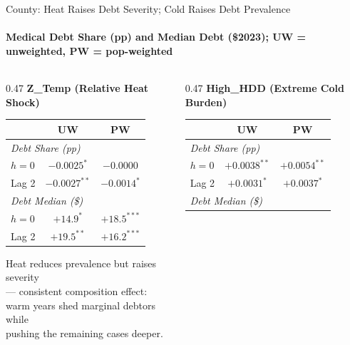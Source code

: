 \documentclass[aspectratio=169,11pt]{beamer}
\newcommand{\emphcolor}[1]{{\color{WarmOrange}\textbf{#1}}}
\newcommand{\tealtext}[1]{{\color{Teal}#1}}
\newcommand{\graytext}[1]{{\color{WarmGray}#1}}
\begin{document}
\begin{frame}{County: Heat Raises Debt Severity; Cold Raises Debt Prevalence}
  \framesubtitle{Medical Debt Share (pp) and Median Debt (\$2023); UW = unweighted, PW = pop-weighted}
  \small
  \begin{columns}[T]
    \begin{column}{0.47\textwidth}
      \tealtext{\textbf{Z\_Temp (Relative Heat Shock)}}\\[0.3em]
      \begin{tabular}{lcc}
        \toprule
        & UW & PW \\
        \midrule
        \multicolumn{3}{l}{\textit{Debt Share (pp)}} \\
        $h{=}0$  & $-0.0025^{*}$  & $-0.0000$ \\
        Lag 2    & \emphcolor{$-0.0027^{**}$} & \emphcolor{$-0.0014^{*}$} \\[0.3em]
        \multicolumn{3}{l}{\textit{Debt Median (\$)}} \\
        $h{=}0$  & \emphcolor{$+14.9^{*}$}   & \emphcolor{$+18.5^{***}$} \\
        Lag 2    & \emphcolor{$+19.5^{**}$}  & \emphcolor{$+16.2^{***}$} \\
        \bottomrule
      \end{tabular}
      \vspace{0.35em}
      \graytext{\scriptsize Heat reduces prevalence but raises severity\\--- consistent composition effect:\\warm years shed marginal debtors while\\pushing the remaining cases deeper.}
    \end{column}
    \begin{column}{0.47\textwidth}
      \tealtext{\textbf{High\_HDD (Extreme Cold Burden)}}\\[0.3em]
      \begin{tabular}{lcc}
        \toprule
        & UW & PW \\
        \midrule
        \multicolumn{3}{l}{\textit{Debt Share (pp)}} \\
        $h{=}0$  & \emphcolor{$+0.0038^{**}$} & \emphcolor{$+0.0054^{**}$} \\
        Lag 2    & $+0.0031^{*}$  & $+0.0037^{*}$  \\[0.3em]
        \multicolumn{3}{l}{\textit{Debt Median (\$)}} \\

\end{tabular}
\end{column}
\end{columns}
\end{frame}
\end{document}
